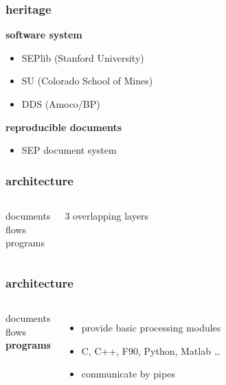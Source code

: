 \begin{frame} \frametitle{\mg heritage}

  \textbf{software system}
  \begin{itemize}
  \item SEPlib (Stanford University)
  \item SU (Colorado School of Mines)
  \item DDS (Amoco/BP)
  \end{itemize}
  
  \vfill
  
  \textbf{reproducible documents}
  \begin{itemize}
  \item SEP document system
  \end{itemize}

\end{frame}
\cwpnote{}

\begin{frame} \frametitle{\mg architecture}

  \begin{columns}
    documents \\
    \vspace{0.25in}
    flows \\
    \vspace{0.25in}
    programs
    
    $3$ overlapping layers
    
  \end{columns}
  
\end{frame}
\cwpnote{}

\begin{frame} \frametitle{\mg architecture}

  \begin{columns}
    documents \\
    \vspace{0.25in}
    flows \\
    \vspace{0.25in}
    \textbf{programs}
    
    \begin{itemize}
    \item provide basic processing modules
    \item C, C++, F90, Python, Matlab \dots
    \item communicate by pipes
    \end{itemize}
    
  \end{columns}
  
\end{frame}
\cwpnote{}

